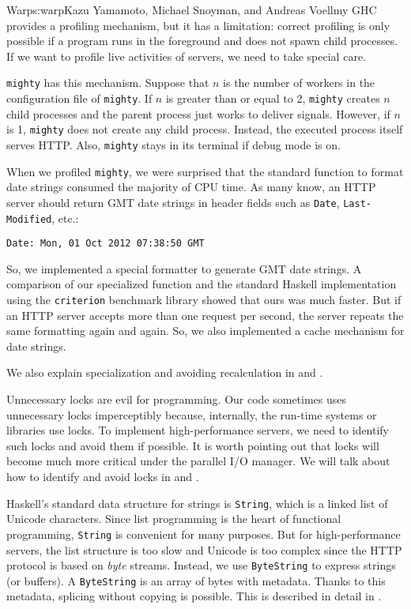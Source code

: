 \begin{aosachapter}{Warp}{s:warp}{Kazu Yamamoto, Michael Snoyman, and Andreas Voellmy}
GHC provides a profiling mechanism, but it has a limitation: correct
profiling is only possible if a program runs in the foreground and does
not spawn child processes. If we want to profile live activities of
servers, we need to take special care.

\texttt{mighty} has this mechanism. Suppose that $n$ is the number of
workers in the configuration file of \texttt{mighty}. If $n$ is greater
than or equal to 2, \texttt{mighty} creates $n$ child processes and the
parent process just works to deliver signals. However, if $n$ is 1,
\texttt{mighty} does not create any child process. Instead, the executed
process itself serves HTTP. Also, \texttt{mighty} stays in its terminal
if debug mode is on.

When we profiled \texttt{mighty}, we were surprised that the standard
function to format date strings consumed the majority of CPU time. As
many know, an HTTP server should return GMT date strings in header
fields such as \texttt{Date}, \texttt{Last-Modified}, etc.:

\begin{verbatim}
Date: Mon, 01 Oct 2012 07:38:50 GMT
\end{verbatim}

So, we implemented a special formatter to generate GMT date strings. A
comparison of our specialized function and the standard Haskell
implementation using the \texttt{criterion} benchmark library showed
that ours was much faster. But if an HTTP server accepts more than one
request per second, the server repeats the same formatting again and
again. So, we also implemented a cache mechanism for date strings.

We also explain specialization and avoiding recalculation in
 and .


Unnecessary locks are evil for programming. Our code sometimes uses
unnecessary locks imperceptibly because, internally, the run-time
systems or libraries use locks. To implement high-performance servers,
we need to identify such locks and avoid them if possible. It is worth
pointing out that locks will become much more critical under the
parallel I/O manager. We will talk about how to identify and avoid locks
in  and
.


Haskell's standard data structure for strings is \texttt{String}, which
is a linked list of Unicode characters. Since list programming is the
heart of functional programming, \texttt{String} is convenient for many
purposes. But for high-performance servers, the list structure is too
slow and Unicode is too complex since the HTTP protocol is based on
\emph{byte} streams. Instead, we use \texttt{ByteString} to express
strings (or buffers). A \texttt{ByteString} is an array of bytes with
metadata. Thanks to this metadata, splicing without copying is possible.
This is described in detail in .


\end{aosachapter}
